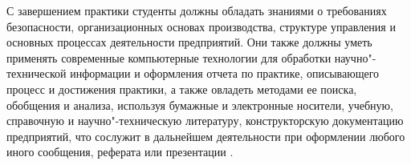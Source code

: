 \documentclass[variant=practice]{bsuir}
\begin{document}
С завершением практики студенты должны обладать знаниями о требованиях
безопасности, организационных основах производства, структуре управления и
основных процессах деятельности предприятий. Они также должны уметь применять
современные компьютерные технологии для обработки научно"-технической информации
и оформления отчета по практике, описывающего процесс и достижения практики, а
также овладеть методами ее поиска, обобщения и анализа, используя бумажные и
электронные носители, учебную, справочную и научно"-техническую литературу,
конструкторскую документацию предприятий, что сослужит в дальнейшем деятельности
при оформлении любого иного сообщения, реферата или презентации
\cite{about-practice}.



\end{document}

